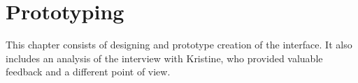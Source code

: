 \chapter{Prototyping}
This chapter consists of designing and prototype creation of the interface. It also includes an analysis of the interview with Kristine, who provided valuable feedback and a different point of view.